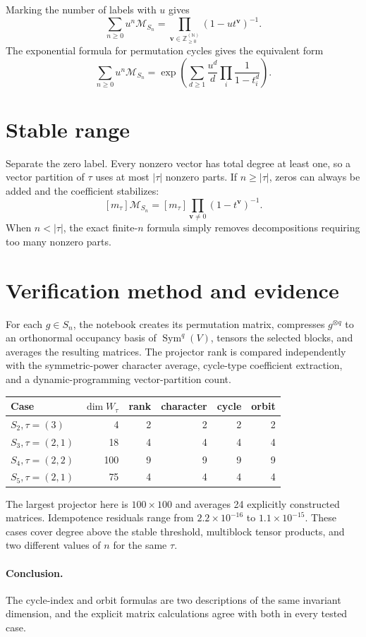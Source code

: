 \documentclass[10pt]{article}
\newcommand{\Sym}{\operatorname{Sym}}
\newcommand{\M}{\mathcal M}
\begin{document}
Marking the number of labels with $u$ gives
\[
 \boxed{\sum_{n\ge0}u^n\M_{S_n}
 =\prod_{\mathbf v\in\mathbb Z_{\ge0}^{(\mathbb N)}}(1-ut^{\mathbf v})^{-1}.}
\]
The exponential formula for permutation cycles gives the equivalent form
\[
 \sum_{n\ge0}u^n\M_{S_n}
 =\exp\left(\sum_{d\ge1}\frac{u^d}{d}
 \prod_i\frac1{1-t_i^d}\right).
\]

\section{Stable range}
Separate the zero label.  Every nonzero vector has total degree at least one,
so a vector partition of $\tau$ uses at most $|\tau|$ nonzero parts.  If
$n\ge|\tau|$, zeros can always be added and the coefficient stabilizes:
\[
 [m_\tau]\M_{S_n}=[m_\tau]\prod_{\mathbf v\ne0}(1-t^{\mathbf v})^{-1}.
\]
When $n<|\tau|$, the exact finite-$n$ formula simply removes decompositions
requiring too many nonzero parts.

\section{Verification method and evidence}
For each $g\in S_n$, the notebook creates its permutation matrix, compresses
$g^{\otimes q}$ to an orthonormal occupancy basis of $\Sym^q(V)$, tensors the
selected blocks, and averages the resulting matrices.  The projector rank is
compared independently with the symmetric-power character average, cycle-type
coefficient extraction, and a dynamic-programming vector-partition count.

\begin{center}
\begin{tabular}{@{}lrrrrr@{}}
\toprule
Case & $\dim W_\tau$ & rank & character & cycle & orbit\\
\midrule
$S_2,\tau=(3)$ & 4 & 2 & 2 & 2 & 2\\
$S_3,\tau=(2,1)$ & 18 & 4 & 4 & 4 & 4\\
$S_4,\tau=(2,2)$ & 100 & 9 & 9 & 9 & 9\\
$S_5,\tau=(2,1)$ & 75 & 4 & 4 & 4 & 4\\
\bottomrule
\end{tabular}
\end{center}
The largest projector here is $100\times100$ and averages 24 explicitly
constructed matrices.  Idempotence residuals range from
$2.2\times10^{-16}$ to $1.1\times10^{-15}$.  These cases cover degree above
the stable threshold, multiblock tensor products, and two different values of
$n$ for the same $\tau$.

\paragraph{Conclusion.}
The cycle-index and orbit formulas are two descriptions of the same invariant
dimension, and the explicit matrix calculations agree with both in every
tested case.
\end{document}
